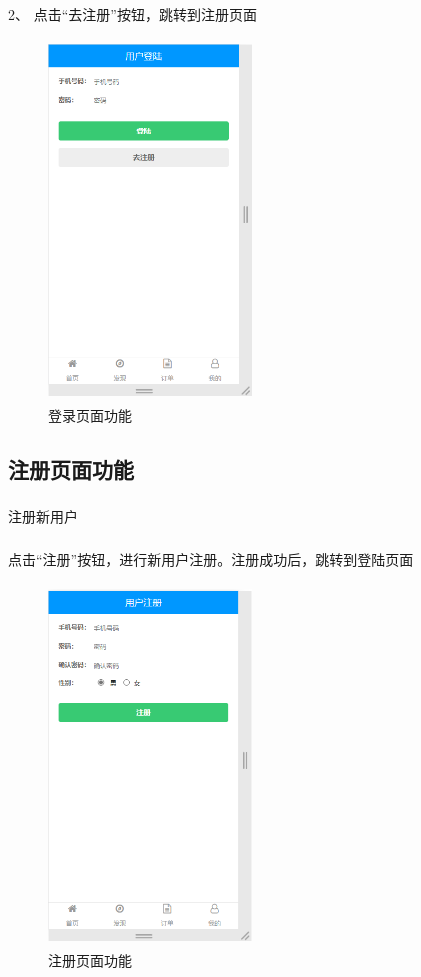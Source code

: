 2、 点击“去注册”按钮，跳转到注册页面
\begin{figure}[H]
    \centering
    \includegraphics[width=5.4cm,height=9.6cm]{figures/3.1.9.png}
    \caption{登录页面功能}
\end{figure}

\subsection{注册页面功能}
\subsubsection*{}
注册新用户
\subsubsection*{}
点击“注册”按钮，进行新用户注册。注册成功后，跳转到登陆页面
\begin{figure}[H]
    \centering
    \includegraphics[width=5.4cm,height=9.6cm]{figures/3.1.10.png}
    \caption{注册页面功能}
\end{figure}

